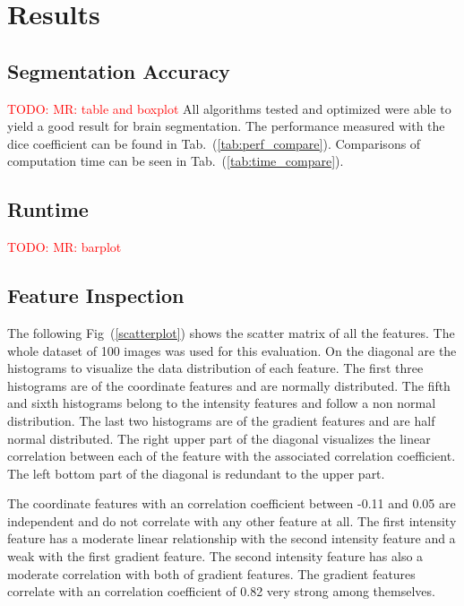 \documentclass[journal]{IEEEtran}
\newcommand\TODO[1]{\textcolor{red}{TODO: #1}}
\begin{document}
\section{Results}
\subsection{Segmentation Accuracy}
\TODO{MR: table and boxplot}
All algorithms tested and optimized were able to yield a good result for brain segmentation. The performance measured with the dice coefficient can be found in Tab.~(\ref{tab:perf_compare}). Comparisons of computation time can be seen in Tab.~(\ref{tab:time_compare}).\\

\subsection{Runtime}
\TODO{MR: barplot}

\subsection{Feature Inspection}



The following Fig~(\ref{scatterplot}) shows the scatter matrix of all the features. The whole dataset of 100 images was used for this evaluation. On the diagonal are the histograms to visualize the data distribution of each feature. The first three histograms are of the coordinate features and are normally distributed. The fifth and sixth histograms belong to the intensity features and follow a non normal distribution. The last two histograms are of the gradient features and are half normal distributed. The right upper part of the diagonal visualizes the linear correlation between each of the feature with the associated correlation coefficient. The left bottom part of the diagonal is redundant to the upper part. 

The coordinate features with an correlation coefficient between -0.11 and 0.05 are independent and do not correlate with any other feature at all. The first intensity feature has a moderate linear relationship with the second intensity feature and a weak with the first gradient feature. The second intensity feature has also a moderate correlation with both of gradient features. The gradient features correlate with an correlation coefficient of 0.82 very strong among themselves.    
\end{document}

